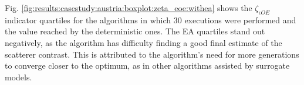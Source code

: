 			
			Fig. \ref{fig:results:casestudy:austria:boxplot:zeta_eoe:withea} shows the $\zeta_{\epsilon OE}$ indicator quartiles for the algorithms in which 30 executions were performed and the value reached by the deterministic ones. The EA quartiles stand out negatively, as the algorithm has difficulty finding a good final estimate of the scatterer contrast. This is attributed to the algorithm's need for more generations to converge closer to the optimum, as in other algorithms assisted by surrogate models.
			
